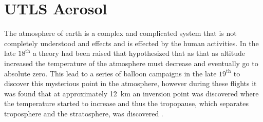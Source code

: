 \section{UTLS Aerosol}

The atmosphere of earth is a complex and complicated system that is not completely understood and effects and is effected by the human activities. In the late $18^{\text{th}}$ a theory had been raised that hypothesized that as that as altitude increased the temperature of the atmosphere must decrease and eventually go to absolute zero. This lead to a series of balloon campaigns in the late $19^{\text{th}}$ to discover this mysterious point in the atmosphere, however during these flights it was found that at approximately 12~km an inversion point was discovered where the temperature started to increase and thus the tropopause, which separates troposphere and the stratosphere, was discovered \citep{Hoinka1997}. 